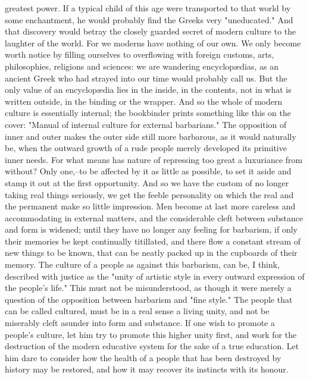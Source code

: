 greatest power. If a typical child of this age were transported to
that world by some enchantment, he would probably find the Greeks
very "uneducated." And that discovery would betray the closely
guarded secret of modern culture to the laughter of the world. For we
moderns have nothing of our own. We only become worth notice by
filling ourselves to overflowing with foreign customs, arts,
philosophies, religions and sciences: we are wandering encyclopædias,
as an ancient Greek who had strayed into our time would probably call
us. But the only value of an encyclopædia lies in the inside, in the
contents, not in what is written outside, in the binding or the
wrapper. And so the whole of modern culture is essentially internal;
the bookbinder prints something like this on the cover: "Manual of
internal culture for external barbarians." The opposition of inner
and outer makes the outer side still more barbarous, as it would
naturally be, when the outward growth of a rude people merely
developed its primitive inner needs. For what means has nature of
repressing too great a luxuriance from without? Only one,--to be
affected by it as little as possible, to set it aside and stamp it
out at the first opportunity. And so we have the custom of no longer
taking real things seriously, we get the feeble personality on which
the real and the permanent make so little impression. Men become at
last more careless and accommodating in external matters, and the
considerable cleft between substance and form is widened; until they
have no longer any feeling for barbarism, if only their memories be
kept continually titillated, and there flow a constant stream of new
things to be known, that can be neatly packed up in the cupboards of
their memory. The culture of a people as against this barbarism, can
be, I think, described with justice as the "unity of artistic style
in every outward expression of the people's life." This must not be
misunderstood, as though it were merely a question of the opposition
between barbarism and "fine style." The people that can be called
cultured, must be in a real sense a living unity, and not be
miserably cleft asunder into form and substance. If one wish to
promote a people's culture, let him try to promote this higher unity
first, and work for the destruction of the modern educative system
for the sake of a true education. Let him dare to consider how the
health of a people that has been destroyed by history may be
restored, and how it may recover its instincts with its honour.

